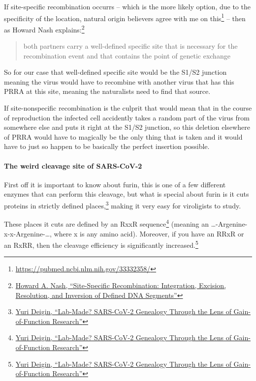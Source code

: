 \documentclass[11pt]{article}
\begin{document}
If site-specific recombination occurrs -- which is the more likely option, due to the specificity of the location, natural origin believers agree with me on this\footnote{\url{https://pubmed.ncbi.nlm.nih.gov/33332358/}} -- then as Howard Nash explains:\footnote{\href{https://www.asmscience.org/files/Chapter\_125\_Site-Specific\_Recombination.pdf}{Howard A. Nash, ``Site-Specific Recombination: Integration, Excision, Resolution, and Inversion of Defined DNA Segments''}}
\begin{quote}
both partners carry a well-defined specific site that is necessary for the recombination event and that contains the point of genetic exchange
\end{quote}
So for our case that well-defined specific site would be the S1/S2 junction meaning the virus would have to recombine with another virus that has this PRRA at this site, meaning the naturalists need to find that source.

If site-nonspecific recombination is the culprit that would mean that in the course of reproduction the infected cell accidently takes a random part of the virus from somewhere else and puts it right at the S1/S2 junction, so this deletion elsewhere of PRRA would have to magically be the only thing that is taken and it would have to just so happen to be basically the perfect insertion possible.
\paragraph{The weird cleavage site of SARS-CoV-2}
\label{sec:orgd1b15ec}
First off it is important to know about furin, this is one of a few different enzymes that can perform this cleavage, but what is special about furin is it cuts proteins in strictly defined places,\footnote{\href{https://yurideigin.medium.com/lab-made-cov2-genealogy-through-the-lens-of-gain-of-function-research-f96dd7413748}{Yuri Deigin, ``Lab-Made? SARS-CoV-2 Genealogy Through the Lens of Gain-of-Function Research''}} making it very easy for viroligists to study.

These places it cuts are defined by an RxxR sequence\footnote{\href{https://yurideigin.medium.com/lab-made-cov2-genealogy-through-the-lens-of-gain-of-function-research-f96dd7413748}{Yuri Deigin, ``Lab-Made? SARS-CoV-2 Genealogy Through the Lens of Gain-of-Function Research''}} (meaning an \ldots{}-Argenine-x-x-Argenine-\ldots{}, where x is any amino acid). Moreover, if you have an RRxR or an RxRR, then the cleavage efficiency is significantly increased.\footnote{\href{https://yurideigin.medium.com/lab-made-cov2-genealogy-through-the-lens-of-gain-of-function-research-f96dd7413748}{Yuri Deigin, ``Lab-Made? SARS-CoV-2 Genealogy Through the Lens of Gain-of-Function Research''}}
\end{document}
